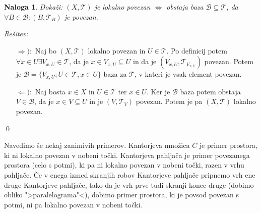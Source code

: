 \documentclass[a4paper, 10pt]{article}
\newtheorem{nal}{Naloga}
\newenvironment{resitev}{\begin{flushleft}\textit{Rešitev:}}{\hfill\end{flushleft}}
\begin{document}
	\begin{nal}
		Dokaži: $(X,\mathcal{T})$ je lokalno povezan $\iff$ obstaja baza $\mathcal{B}\subseteq\mathcal{T}$, da $\forall B\in \mathcal{B}: (B, \mathcal{T}_B)$ je povezan.
	\end{nal}
	\begin{resitev}
		\begin{itemize}
			\item[$\Rightarrow):$] Naj bo $(X, \mathcal{T})$ lokalno povezan in $U\in \mathcal{T}$. Po definicij potem $\forall x\in U \exists V_{x, U} \in \mathcal{T}$, da je $x\in V_{x, U}\subseteq U$ in da je $(V_{x, U}, \mathcal{T}_{V_{x, U}})$ povezan. Potem je $\mathcal{B} = \{V_{x, U}; U\in \mathcal{T}, x\in U\}$ baza za $\mathcal{T}$, v kateri je vsak element povezan.
			\item[$\Leftarrow):$] Naj bosta $x\in X$ in $U\in \mathcal{T}$ ter $x\in U$. Ker je $\mathcal{B}$ baza potem obstaja $V\in \mathcal{B}$, da je $x\in V\subseteq U$ in je $(V, \mathcal{T}_V)$ povezan. Potem je pa $(X, \mathcal{T})$ lokalno povezan.
		\end{itemize}
		\qed
	\end{resitev}
	Navedimo še nekaj zanimivih primerov. Kantorjeva množica $C$ je primer prostora, ki ni lokalno povezan v nobeni točki. Kantorjeva pahljača je primer povezanega prostora (celo s potmi), ki pa ni lokalno povezan v nobeni točki, razen v vrhu pahljače. Če v enega izmed skranjih robov Kantorjeve pahljače pripnemo vrh ene druge Kantorjeve pahljače, tako da je vrh prve tudi skranji konec druge (dobimo obliko ">paralelograma"<), dobimo primer prostora, ki je povsod povezan s potmi, ni pa lokalno povezan v nobeni točki.
\end{document}

